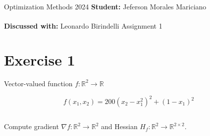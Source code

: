 \documentclass[unicode,11pt,a4paper,oneside,numbers=endperiod,openany]{scrartcl}
\begin{document}
\setassignment
{}

\serieheader
{Optimization Methods}
{2024}
{\textbf{Student:} Jeferson Morales Mariciano \\\\}
{\textbf{Discussed with:} Leonardo Birindelli}
{Assignment 1}{}
\newline



\section{Exercise 1}
Vector-valued function $f : \mathbb{R}^2 \rightarrow \mathbb{R}$

\begin{equation}
    f(x_1, x_2) = 200 (x_2 - x_1^2)^2 + (1 - x_1)^2
\end{equation}

\subsection{}
Compute gradient $\nabla f : \mathbb{R}^2 \rightarrow \mathbb{R}^2$
and Hessian $H_f : \mathbb{R}^2 \rightarrow \mathbb{R}^{2 \times 2}$. \newline
\end{document}
